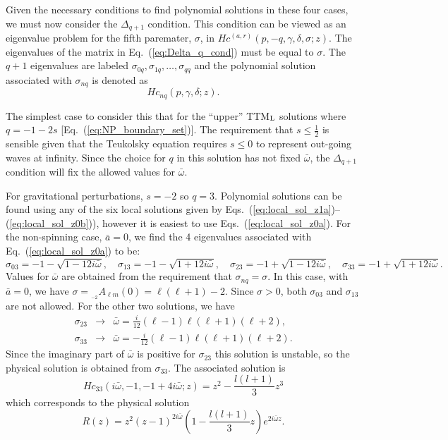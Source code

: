 \documentclass[11pt]{article}
\newcommand{\scA}[4][]{{}_{{}_{#2}}A^{#1}_{#3}(#4)}
\begin{document}
Given the necessary conditions to find polynomial solutions in these
four cases, we must now consider the $\Delta_{q+1}$ condition.  This
condition can be viewed as an eigenvalue problem for the fifth
paremater, $\sigma$, in $Hc^{(a,r)}(p,-q,\gamma,\delta,\sigma;z)$. The
eigenvalues of the matrix in Eq.~(\ref{eq:Delta_q_cond}) must be equal
to $\sigma$.  The $q+1$ eigenvalues are labeled
$\sigma_{0q},\sigma_{1q},\ldots,\sigma_{qq}$ and the polynomial
solution associated with $\sigma_{nq}$ is denoted as
\begin{equation}
  Hc_{nq}(p,\gamma,\delta;z).
\end{equation}

The simplest case to consider this that for the ``upper''
TTM${}_{\rm{L}}$ solutions where $q=-1-2s$
[Eq.~(\ref{eq:NP_boundary_set})].  The requirement that $s\le\frac12$
is sensible given that the Teukolsky equation requires $s\le0$ to
represent out-going waves at infinity.  Since the choice for $q$ in
this solution has not fixed $\bar\omega$, the $\Delta_{q+1}$ condition
will fix the allowed values for $\bar\omega$.

For gravitational perturbations, $s=-2$ so $q=3$.  Polynomial
solutions can be found using any of the six local solutions given by
Eqs.~(\ref{eq:local_sol_z1a})--(\ref{eq:local_sol_z0b})), however it
is easiest to use Eqs.~(\ref{eq:local_sol_z0a}).  For the non-spinning
case, $\bar{a}=0$, we find the 4 eigenvalues associated with
Eq.~(\ref{eq:local_sol_z0a}) to be:
\begin{equation}
\sigma_{03}=-1-\sqrt{1-12i\bar\omega},\quad
\sigma_{13}=-1-\sqrt{1+12i\bar\omega},\quad
\sigma_{23}=-1+\sqrt{1-12i\bar\omega},\quad
\sigma_{33}=-1+\sqrt{1+12i\bar\omega}.
\end{equation}
Values for $\bar\omega$ are obtained from the requirement that
$\sigma_{nq}=\sigma$.  In this case, with $\bar{a}=0$, we have
$\sigma=\scA{-2}{\ell{m}}{0}=\ell(\ell+1)-2$.  Since $\sigma>0$, both
$\sigma_{03}$ and $\sigma_{13}$ are not allowed.  For the other
two solutions, we have
\begin{eqnarray}
  \sigma_{23}&\to&\bar\omega=\frac{i}{12}(\ell-1)\ell(\ell+1)(\ell+2), \\
  \sigma_{33}&\to&\bar\omega=-\frac{i}{12}(\ell-1)\ell(\ell+1)(\ell+2).
\end{eqnarray}
Since the imaginary part of $\bar\omega$ is positive for
$\sigma_{23}$ this solution is unstable, so the physical solution is
obtained from $\sigma_{33}$.  The associated solution is
\begin{equation}\label{eq:TTML_a0_H_sol1}
  Hc_{33}(i\bar\omega,-1,-1+4i\bar\omega;z) = z^2-\frac{l(l+1)}3z^3
\end{equation}
which corresponds to the physical solution
\begin{equation}\label{eq:TTML_a0_R_sol1}
  R(z) = z^2(z-1)^{2i\bar\omega}\left(1-\frac{l(l+1)}3z\right)e^{2i\bar\omega z}.
\end{equation}
\end{document}
